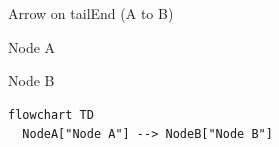 \documentclass[11pt,a4paper]{article}
\begin{document}
Arrow on tailEnd (A to B)

Node A

Node B

\begin{figure}[h]
\end{figure}

\begin{verbatim}
flowchart TD
  NodeA["Node A"] --> NodeB["Node B"]
\end{verbatim}
\end{document}
